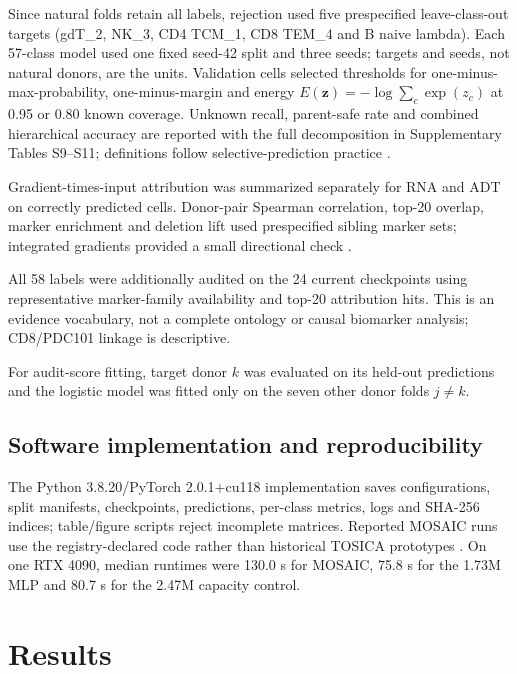 \documentclass[unnumsec,webpdf,contemporary,large,numbered]{oup-authoring-template}
\begin{document}
Since natural folds retain all labels, rejection used five prespecified leave-class-out targets (gdT\_2, NK\_3, CD4 TCM\_1, CD8 TEM\_4 and B naive lambda). Each 57-class model used one fixed seed-42 split and three seeds; targets and seeds, not natural donors, are the units. Validation cells selected thresholds for one-minus-max-probability, one-minus-margin and energy $E(\mathbf z)=-\log\sum_c\exp(z_c)$ \citep{liu2020energy} at 0.95 or 0.80 known coverage. Unknown recall, parent-safe rate and combined hierarchical accuracy are reported with the full decomposition in Supplementary Tables S9--S11; definitions follow selective-prediction practice \citep{gal2016,geifman2017,guo2017calibration,hendrycks2017,lakshminarayanan2017}.

Gradient-times-input attribution was summarized separately for RNA and ADT on correctly predicted cells. Donor-pair Spearman correlation, top-20 overlap, marker enrichment and deletion lift used prespecified sibling marker sets; integrated gradients provided a small directional check \citep{sundararajan2017,lundberg2017,montavon2019,ribeiro2016,samek2021}.

All 58 labels were additionally audited on the 24 current checkpoints using representative marker-family availability and top-20 attribution hits. This is an evidence vocabulary, not a complete ontology or causal biomarker analysis; CD8/PDC101 linkage is descriptive.

For audit-score fitting, target donor $k$ was evaluated on its held-out predictions and the logistic model was fitted only on the seven other donor folds $j\ne k$.

\subsection{Software implementation and reproducibility}

The Python 3.8.20/PyTorch 2.0.1+cu118 implementation saves configurations, split manifests, checkpoints, predictions, per-class metrics, logs and SHA-256 indices; table/figure scripts reject incomplete matrices. Reported MOSAIC runs use the registry-declared code rather than historical TOSICA prototypes \citep{chen2023tosica}. On one RTX 4090, median runtimes were 130.0 s for MOSAIC, 75.8 s for the 1.73M MLP and 80.7 s for the 2.47M capacity control.

\section{Results}
\end{document}
